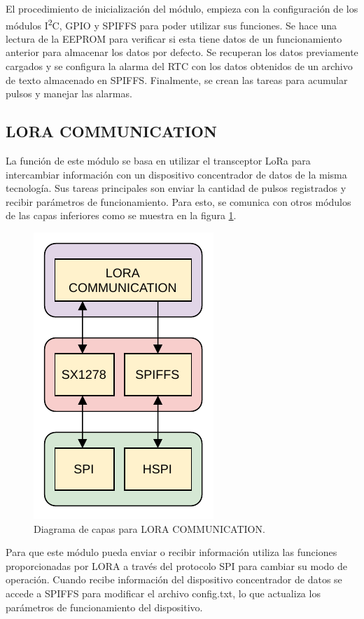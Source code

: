 El procedimiento de inicialización del módulo, empieza con la configuración de los módulos I\textsuperscript{2}C, GPIO y SPIFFS para poder utilizar sus funciones. Se hace una lectura de la EEPROM para verificar si esta tiene datos de un funcionamiento anterior para almacenar los datos por defecto. Se recuperan los datos previamente cargados y se configura la alarma del RTC con los datos obtenidos de un archivo de texto almacenado en SPIFFS. Finalmente, se crean las tareas para acumular pulsos y manejar las alarmas.

\subsection{LORA COMMUNICATION}	

La función de este módulo se basa en utilizar el transceptor LoRa para intercambiar información con un dispositivo concentrador de datos de la misma tecnología. Sus tareas principales son enviar la cantidad de pulsos registrados y recibir parámetros de funcionamiento. Para esto, se comunica con otros módulos de las capas inferiores como se muestra en la figura \ref{fig:loraDiagram}.

\begin{figure}[h]
	\centering
	\includegraphics[scale=1]{./Figures/lora_communication_diagram.pdf}
	\caption{Diagrama de capas para LORA COMMUNICATION.}
		\label{fig:loraDiagram}
\end{figure}

Para que este módulo pueda enviar o recibir información utiliza las funciones proporcionadas por LORA a través del protocolo SPI para cambiar su modo de operación. Cuando recibe información del dispositivo concentrador de datos se accede a SPIFFS para modificar el archivo config.txt, lo que actualiza los parámetros de funcionamiento del dispositivo.

